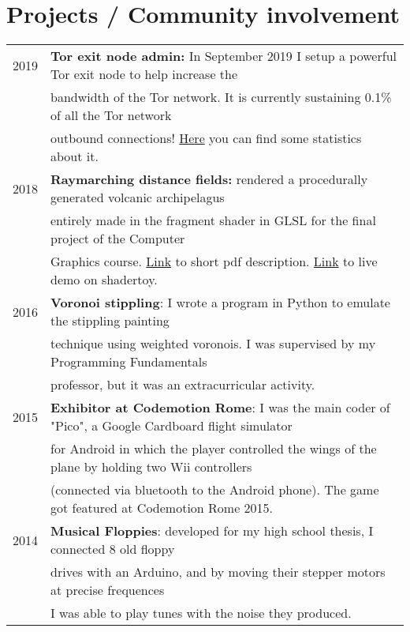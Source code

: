 \documentclass[a4paper,10pt]{article} %
\newcommand{\mh}[0]{{\hspace*{-1em}}}
\newcommand{\mH}[0]{{\hspace*{0.5em}}}
\begin{document}
\section{Projects / Community involvement}
\begin{tabular}{ll}
2019 \mH & \mh \textbf{Tor exit node admin:} In September 2019 I setup a powerful Tor exit node to help increase the\\
     & bandwidth of the Tor network. It is currently sustaining 0.1\% of all the Tor network\\
     & outbound connections! \href{https://metrics.torproject.org/rs.html#details/229D865D7AC084D30E5F5016CE5A8C21740F74F4}{Here} you can find some statistics about it. \\
2018 &  \mh \textbf{Raymarching distance fields:} rendered a procedurally generated volcanic archipelagus \\
     & entirely made in the fragment shader in GLSL for the final project of the Computer \\
     & Graphics course. \href{https://drive.google.com/open?id=1U4zynGm8o4i8VodnaWTOjgoayj9rhega}{Link} to short pdf description. 
       \href{https://www.shadertoy.com/view/4dcyzM}{Link} to live demo on shadertoy. \\
2016 &  \mh \textbf{Voronoi stippling}: I wrote a program in Python to emulate the stippling painting \\
     & technique using weighted voronois. I was supervised by my Programming Fundamentals \\
     & professor, but it was an extracurricular activity. \\
2015 & \mh \textbf{Exhibitor at Codemotion Rome}: I was the main coder of "Pico", a Google Cardboard flight simulator \\
     & for Android in which the player controlled the wings of the plane by holding two Wii controllers \\
     & (connected via bluetooth to the Android phone). The game got featured at Codemotion Rome 2015. \\
2014 & \mh \textbf{Musical Floppies}: developed for my high school thesis, I connected 8 old floppy \\
     & drives with an Arduino, and by moving their stepper motors at precise frequences \\
     & I was able to play tunes with the noise they produced.\\
\end{tabular}
\end{document}
